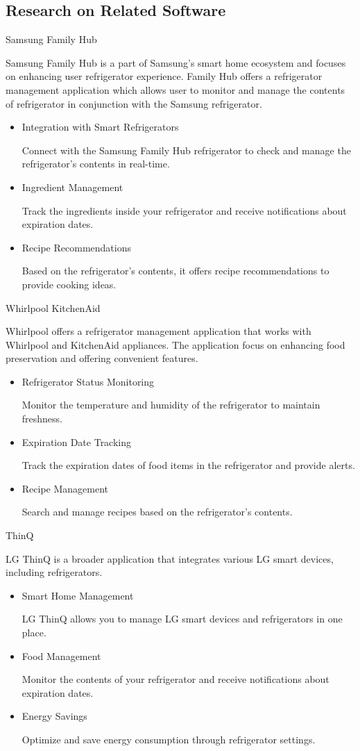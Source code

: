 \documentclass[conference]{IEEEtran}
\begin{document}
\subsection{Research on Related Software}
Samsung Family Hub\par
Samsung Family Hub is a part of Samsung's smart home ecosystem and focuses on enhancing user refrigerator experience. Family Hub offers a refrigerator management application which allows user to monitor and manage the contents of refrigerator in conjunction with the Samsung refrigerator.
\begin{itemize}
    \item Integration with Smart Refrigerators\par
    Connect with the Samsung Family Hub refrigerator to check and manage the refrigerator's contents in real-time.
    \item Ingredient Management\par
    Track the ingredients inside your refrigerator and receive notifications about expiration dates.
    \item Recipe Recommendations\par
    Based on the refrigerator's contents, it offers recipe recommendations to provide cooking ideas.
\end{itemize}
Whirlpool KitchenAid\par
Whirlpool offers a refrigerator management application that works with Whirlpool and KitchenAid appliances. The application focus on enhancing food preservation and offering convenient features. 
\begin{itemize}
    \item Refrigerator Status Monitoring\par
    Monitor the temperature and humidity of the refrigerator to maintain freshness.
    \item Expiration Date Tracking\par
    Track the expiration dates of food items in the refrigerator and provide alerts.
    \item Recipe Management\par
    Search and manage recipes based on the refrigerator's contents.
\end{itemize}
ThinQ\par
LG ThinQ is a broader application that integrates various LG smart devices, including refrigerators.
\begin{itemize}
    \item Smart Home Management\par
    LG ThinQ allows you to manage LG smart devices and refrigerators in one place.
    \item Food Management\par
    Monitor the contents of your refrigerator and receive notifications about expiration dates.
    \item Energy Savings\par
    Optimize and save energy consumption through refrigerator settings.
\end{itemize}
\end{document}
